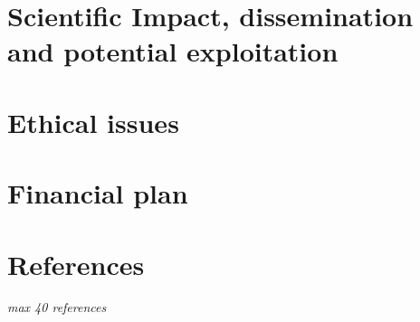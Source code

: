 \documentclass[11pt,twoside,a4paper]{article}
\begin{document}
\section{Scientific Impact, dissemination and potential exploitation}
\label{sec:scientific-impact}


\section{Ethical issues}
\label{sec:ethical-issues}


\section{Financial plan}
\label{sec:financial-plan}




\section{References}

\emph{max 40 references}


\end{document}
